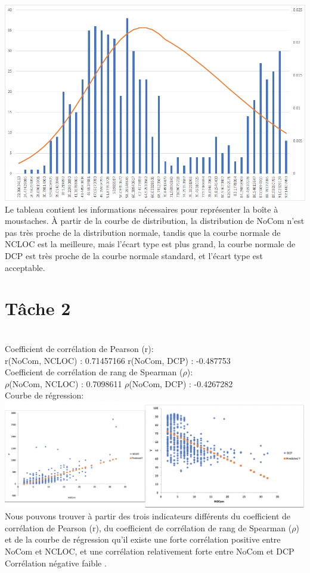 \documentclass{article}
\begin{document}
\includegraphics[scale=0.35]{T1_4.png}\\

Le tableau contient les informations nécessaires pour représenter la boîte à moustaches. À partir de la courbe de distribution, la distribution de NoCom n'est pas très proche de la distribution normale, tandis que la courbe normale de NCLOC est la meilleure, mais l'écart type est plus grand, la courbe normale de DCP est très proche de la courbe normale standard, et l'écart type est acceptable.\\


\section*{Tâche 2}\\

Coefficient de corrélation de Pearson (r):\\

r(NoCom, NCLOC) : 0.71457166 \qquad r(NoCom, DCP) : -0.487753\\

Coefficient de corrélation de rang de Spearman ($\rho$):\\

$\rho$(NoCom, NCLOC) : 0.7098611 \qquad $\rho$(NoCom, DCP) : -0.4267282\\

Courbe de régression:\\
\includegraphics[scale=0.6]{T2.png}\\
Nous pouvons trouver à partir des trois indicateurs différents du coefficient de corrélation de Pearson (r), du coefficient de corrélation de rang de Spearman ($\rho$) et de la courbe de régression qu'il existe une forte corrélation positive entre NoCom et NCLOC, et une corrélation relativement forte entre NoCom et DCP Corrélation négative faible .
\end{document}
